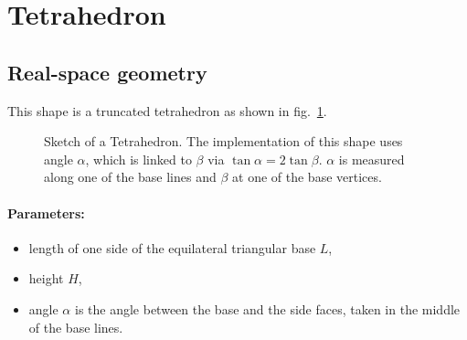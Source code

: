 
\newpage{\cleardoublepage}
\section{Tetrahedron}   
 
\subsection{Real-space geometry}
This shape is a truncated tetrahedron as shown in fig.~\ref{fig:tetrahedron}.

\begin{figure}[ht]
\hfill
{}
\hfill
{}
\hfill
\caption{Sketch of a Tetrahedron. The implementation of this shape uses angle
  $\alpha$, which is linked to $\beta$ via $\tan \alpha = 2 \tan 
  \beta$. $\alpha$ is measured along one of the base lines and $\beta$
  at one of the base vertices.}
\label{fig:tetrahedron}
\end{figure}

\FloatBarrier

\paragraph{Parameters:}
\begin{itemize}
\item length of one side of the equilateral triangular base $L$,
\item height $H$,
\item angle $\alpha$ is the angle between the base and the
  side faces, taken in the middle of the base lines.
\end{itemize}

